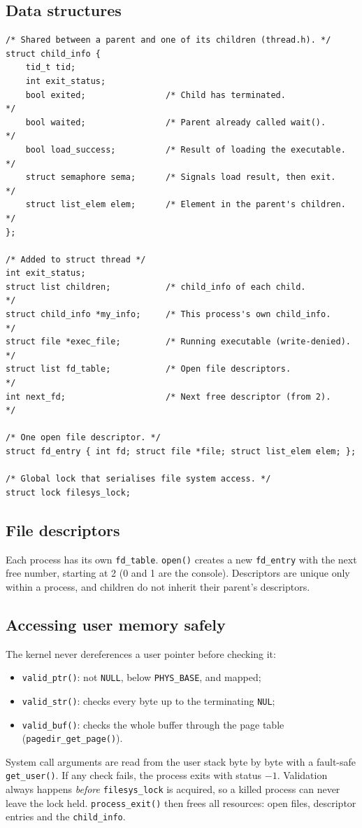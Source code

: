 \documentclass[a4paper,11pt]{article}
\newcommand{\code}[1]{\texttt{#1}}
\begin{document}
\subsection*{Data structures}
\begin{Verbatim}[frame=single]
/* Shared between a parent and one of its children (thread.h). */
struct child_info {
    tid_t tid;
    int exit_status;
    bool exited;                /* Child has terminated.                 */
    bool waited;                /* Parent already called wait().         */
    bool load_success;          /* Result of loading the executable.     */
    struct semaphore sema;      /* Signals load result, then exit.       */
    struct list_elem elem;      /* Element in the parent's children.     */
};

/* Added to struct thread */
int exit_status;
struct list children;           /* child_info of each child.         */
struct child_info *my_info;     /* This process's own child_info.    */
struct file *exec_file;         /* Running executable (write-denied). */
struct list fd_table;           /* Open file descriptors.            */
int next_fd;                    /* Next free descriptor (from 2).    */

/* One open file descriptor. */
struct fd_entry { int fd; struct file *file; struct list_elem elem; };

/* Global lock that serialises file system access. */
struct lock filesys_lock;
\end{Verbatim}

\subsection*{File descriptors}
Each process has its own \code{fd\_table}. \code{open()} creates a new \code{fd\_entry} with the next free number, starting at 2 (0 and 1 are the console). Descriptors are unique only within a process, and children do not inherit their parent's descriptors.

\subsection*{Accessing user memory safely}
The kernel never dereferences a user pointer before checking it:
\begin{itemize}
  \item \code{valid\_ptr()}: not \code{NULL}, below \code{PHYS\_BASE}, and mapped;
  \item \code{valid\_str()}: checks every byte up to the terminating \code{NUL};
  \item \code{valid\_buf()}: checks the whole buffer through the page table (\code{pagedir\_get\_page()}).
\end{itemize}
System call arguments are read from the user stack byte by byte with a fault-safe \code{get\_user()}. If any check fails, the process exits with status $-1$. Validation always happens \emph{before} \code{filesys\_lock} is acquired, so a killed process can never leave the lock held. \code{process\_exit()} then frees all resources: open files, descriptor entries and the \code{child\_info}.
\end{document}

